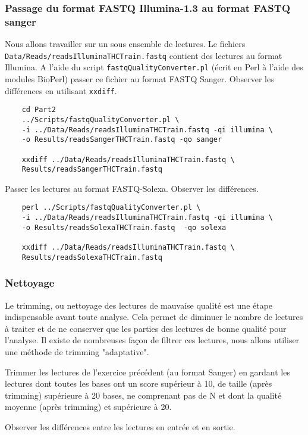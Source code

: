 \documentclass[a4paper,12pt]{article}
\begin{document}
\subsubsection{Passage du format FASTQ Illumina-1.3 au format FASTQ sanger}
Nous allons travailler sur un sous ensemble de lectures. Le fichiers \verb=Data/Reads/readsIlluminaTHCTrain.fastq= contient des lectures au format Illumina. A l'aide du script \verb=fastqQualityConverter.pl= (écrit en Perl à l'aide des modules BioPerl) passer ce fichier au format FASTQ Sanger. Observer les différences
en utilisant \verb=xxdiff=.
\begin{lstlisting}
	cd Part2
	../Scripts/fastqQualityConverter.pl \
	-i ../Data/Reads/readsIlluminaTHCTrain.fastq -qi illumina \
	-o Results/readsSangerTHCTrain.fastq -qo sanger
	
	xxdiff ../Data/Reads/readsIlluminaTHCTrain.fastq \
	Results/readsSangerTHCTrain.fastq
\end{lstlisting}


Passer les lectures au format FASTQ-Solexa. Observer les différences.

\begin{lstlisting}
	perl ../Scripts/fastqQualityConverter.pl \
	-i ../Data/Reads/readsIlluminaTHCTrain.fastq -qi illumina \
	-o Results/readsSolexaTHCTrain.fastq  -qo solexa
	
	xxdiff ../Data/Reads/readsIlluminaTHCTrain.fastq \
	Results/readsSolexaTHCTrain.fastq
	\end{lstlisting}
	
	
\subsubsection{Nettoyage}
Le trimming, ou nettoyage des lectures de mauvaise qualité est une étape indispensable avant toute analyse. Cela permet de diminuer le nombre de lectures à traiter et de ne conserver que les parties des lectures de bonne qualité pour l'analyse. Il existe de nombreuses façon de filtrer ces lectures, nous allons utiliser une méthode de  trimming "adaptative".

Trimmer les lectures de l'exercice précédent (au format Sanger) en gardant les lectures dont toutes les bases ont  un score supérieur à 10, de taille (après trimming) supérieure à 20 bases, ne comprenant pas de N et dont la qualité moyenne (après trimming) et supérieure à 20. 

Observer les différences entre les lectures en entrée et en sortie.
\end{document}
